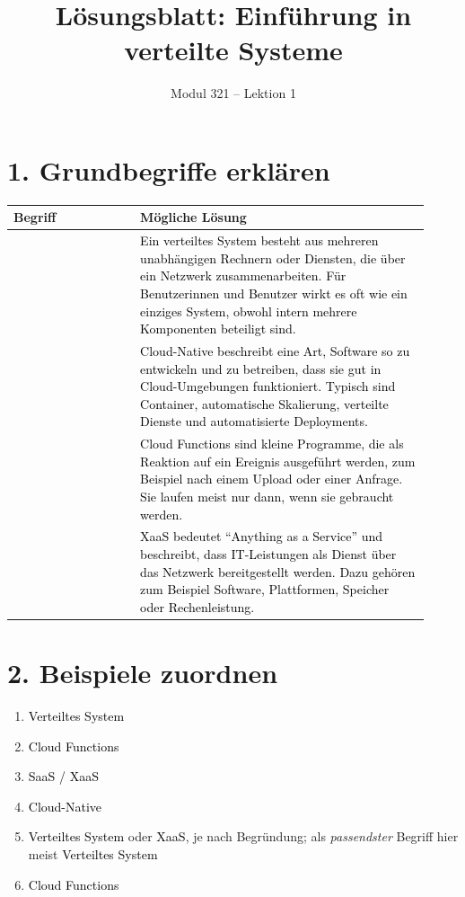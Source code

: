 \documentclass[11pt,a4paper]{article}
\title{\textbf{L\"osungsblatt: Einf\"uhrung in verteilte Systeme}}
\author{Modul 321 -- Lektion 1}
\date{}
\newcommand{\term}[1]{\fcolorbox{black!20}{blue!6}{\strut #1}}
\newcommand{\solution}[1]{\textcolor{black}{#1}}
\begin{document}
\maketitle


\section*{1. Grundbegriffe erkl\"aren}
\begin{longtable}{|>{\raggedright\arraybackslash}p{0.28\linewidth}|>{\raggedright\arraybackslash}p{0.64\linewidth}|}
\hline
\textbf{Begriff} & \textbf{M\"ogliche L\"osung} \\
\hline
\term{Verteiltes System} &
\solution{Ein verteiltes System besteht aus mehreren unabh\"angigen Rechnern oder Diensten, die \"uber ein Netzwerk zusammenarbeiten. F\"ur Benutzerinnen und Benutzer wirkt es oft wie ein einziges System, obwohl intern mehrere Komponenten beteiligt sind.} \\ \hline
\term{Cloud-Native} &
\solution{Cloud-Native beschreibt eine Art, Software so zu entwickeln und zu betreiben, dass sie gut in Cloud-Umgebungen funktioniert. Typisch sind Container, automatische Skalierung, verteilte Dienste und automatisierte Deployments.} \\ \hline
\term{Cloud Functions} &
\solution{Cloud Functions sind kleine Programme, die als Reaktion auf ein Ereignis ausgef\"uhrt werden, zum Beispiel nach einem Upload oder einer Anfrage. Sie laufen meist nur dann, wenn sie gebraucht werden.} \\ \hline
\term{XaaS} &
\solution{XaaS bedeutet ``Anything as a Service'' und beschreibt, dass IT-Leistungen als Dienst \"uber das Netzwerk bereitgestellt werden. Dazu geh\"oren zum Beispiel Software, Plattformen, Speicher oder Rechenleistung.} \\ \hline
\end{longtable}

\section*{2. Beispiele zuordnen}
\begin{enumerate}
  \item \solution{Verteiltes System}
  \item \solution{Cloud Functions}
  \item \solution{SaaS / XaaS}
  \item \solution{Cloud-Native}
  \item \solution{Verteiltes System} oder \solution{XaaS}, je nach Begr\"undung; als \emph{passendster} Begriff hier meist \solution{Verteiltes System}
  \item \solution{Cloud Functions}
\end{enumerate}
\end{document}
